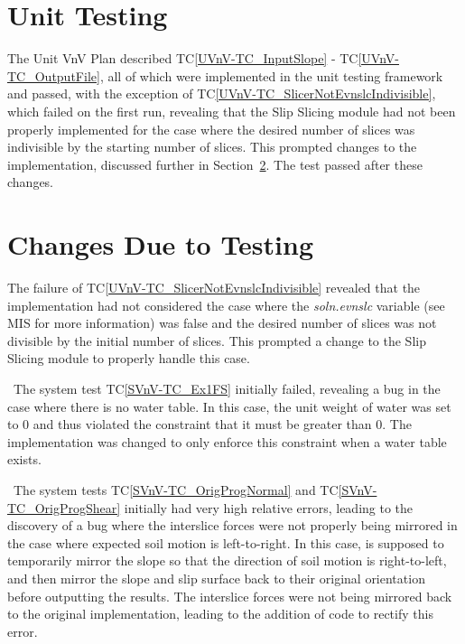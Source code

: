 \documentclass[12pt, titlepage]{article}
\newcommand{\tcref}[1]{TC\ref{#1}}
\begin{document}
\section{Unit Testing}  \label{sec_UnitTests}
The Unit VnV Plan described \tcref{UVnV-TC_InputSlope} - 
\tcref{UVnV-TC_OutputFile}, all of which were implemented in the unit testing 
framework and passed, with the exception of 
\tcref{UVnV-TC_SlicerNotEvnslcIndivisible}, which failed on the first run, 
revealing that the Slip Slicing module had not been properly implemented for 
the case where the desired number of slices was indivisible by the starting 
number of slices. This prompted changes to the implementation, discussed 
further in Section~\ref{sec_Changes}. The test passed after these changes.

\section{Changes Due to Testing} \label{sec_Changes}
The failure of \tcref{UVnV-TC_SlicerNotEvnslcIndivisible} revealed that the 
implementation had not considered the case where the \textit{soln.evnslc} 
variable (see MIS for more information) was false and the desired number of 
slices was not divisible by the initial number of slices. This prompted a 
change to the Slip Slicing module to properly handle this case. 

~\newline \noindent The system test \tcref{SVnV-TC_Ex1FS} initially failed, 
revealing a bug in the case where there is no water table. In this case, the 
unit weight of water was set to 0 and thus violated the constraint that it must 
be greater than 0. The implementation was changed to only enforce this 
constraint when a water table exists.

~\newline \noindent The system tests \tcref{SVnV-TC_OrigProgNormal} 
and \tcref{SVnV-TC_OrigProgShear} initially had very high relative errors, 
leading to the discovery of a bug where the interslice forces were not properly 
being mirrored in the case where expected soil motion is left-to-right. In this 
case, \progname{} is supposed to temporarily mirror the slope so that the 
direction of soil motion is right-to-left, and then mirror the slope and slip 
surface back to their original orientation before outputting the results. The 
interslice forces were not being mirrored back to the original implementation, 
leading to the addition of code to rectify this error.
\end{document}
